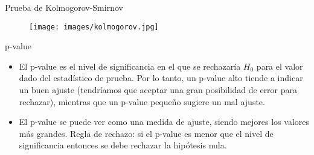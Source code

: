\begin{frame}{Prueba de Kolmogorov-Smirnov}
\begin{figure}
    \centering
    \texttt{[image: images/kolmogorov.jpg]}
    \label{fig:kolmogorov}
\end{figure}
\end{frame}

\begin{frame}{p-value}
    \begin{itemize}
        \item El p-value es el nivel de significancia en el que se rechazaría $H_0$ para el valor dado del estadístico de prueba. Por lo tanto, un p-value alto tiende a indicar un buen ajuste (tendríamos que aceptar una gran posibilidad de error para rechazar), mientras que un p-value pequeño sugiere un mal ajuste.
        \item El p-value se puede ver como una medida de ajuste, siendo mejores los valores más grandes. Regla de rechazo: si el p-value es menor que el nivel de significancia entonces se debe rechazar la hipótesis nula.
    \end{itemize}
\end{frame}